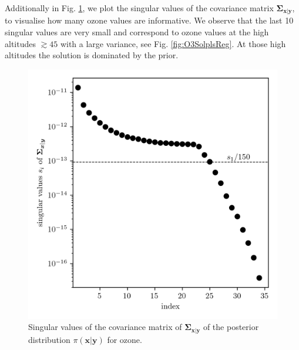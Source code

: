 Additionally in Fig. \ref{fig:PostCov}, we plot the singular values of the covariance matrix $\bm{\Sigma}_{ \bm{x}|\bm{y}}$, to visualise how many ozone values are informative.
We observe that the last 10 singular values are very small and correspond to ozone values at the high altitudes $\gtrsim 45$ with a large variance, see Fig. \ref{fig:O3SolplsReg}.
At those high altitudes the solution is dominated by the prior.
\begin{figure}[ht!]
	\centering
	\includegraphics{CovSing.png}
	\caption[Singular values of the posterior covariance matrix]{Singular values of the covariance matrix of $\bm{\Sigma}_{ \bm{x}|\bm{y}}$ of the posterior distribution $\pi(\bm{x}|\bm{y})$ for ozone.}
	\label{fig:PostCov}
\end{figure}
\clearpage


